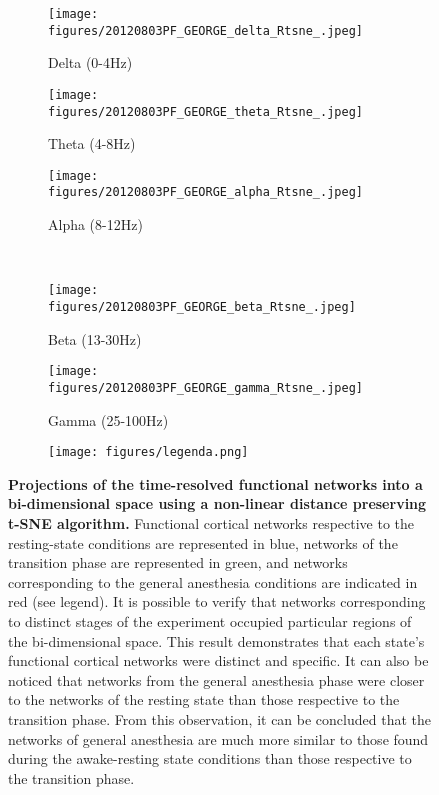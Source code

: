 \documentclass[twoside]{article}
\begin{document}
\begin{figure}[!h]
\centering
  \begin{subfigure}[b]{.32\linewidth}
    \centering
    \texttt{[image: figures/20120803PF\_GEORGE\_delta\_Rtsne\_.jpeg]}
    \caption{Delta (0-4Hz)}\label{fig:1a}
  \end{subfigure}%
  \begin{subfigure}[b]{.32\linewidth}
    \centering
    \texttt{[image: figures/20120803PF\_GEORGE\_theta\_Rtsne\_.jpeg]}
    \caption{Theta (4-8Hz)}\label{fig:1b}
  \end{subfigure}%
  \begin{subfigure}[b]{.32\linewidth}
    \centering
    \texttt{[image: figures/20120803PF\_GEORGE\_alpha\_Rtsne\_.jpeg]}
    \caption{Alpha (8-12Hz)}\label{fig:1c}
  \end{subfigure}\\%
  \begin{subfigure}[b]{.32\linewidth}
    \centering
    \texttt{[image: figures/20120803PF\_GEORGE\_beta\_Rtsne\_.jpeg]}
    \caption{Beta (13-30Hz)}\label{fig:1d}
  \end{subfigure}%
  \begin{subfigure}[b]{.32\linewidth}
    \centering
    \texttt{[image: figures/20120803PF\_GEORGE\_gamma\_Rtsne\_.jpeg]}
    \caption{Gamma (25-100Hz)}\label{fig:1e}
  \end{subfigure}%
   \begin{subfigure}[b]{.32\linewidth}
    \centering
    \texttt{[image: figures/legenda.png]}
      \end{subfigure}%
  \caption{\textbf{Projections of the time-resolved functional networks into a bi-dimensional space using a non-linear distance preserving t-SNE algorithm.} Functional cortical networks respective to the resting-state conditions are represented in blue, networks of the transition phase are represented in green, and networks corresponding to the general anesthesia conditions are indicated in red (see legend). It is possible to verify that networks corresponding to distinct stages of the experiment occupied particular regions of the bi-dimensional space. This result demonstrates that each state's functional cortical networks were distinct and specific. It can also be noticed that networks from the general anesthesia phase were closer to the networks of the resting state than those respective to the transition phase. From this observation, it can be concluded that the networks of general anesthesia are much more similar to those found during the awake-resting state conditions than those respective to the transition phase.
}\label{fig:1}
\end{figure}
\end{document}
